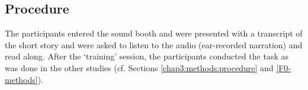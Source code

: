 \subsection{Procedure}

The participants entered the sound booth and were presented with a transcript of the short story and were asked to listen to the audio (ear-recorded narration) and read along.  After the `training' session, the participants conducted the task as was done in the other studies (cf. Sections \ref{chap3:methods:procedure} and \ref{F0-methods}).



\DIFdelbegin %





